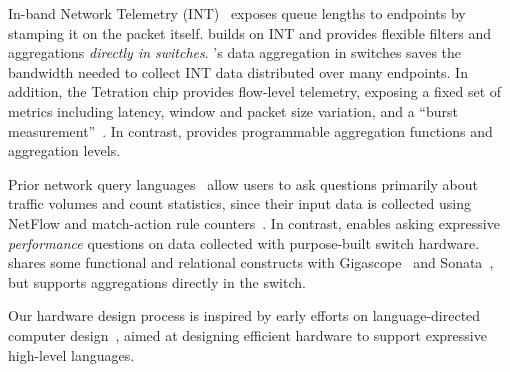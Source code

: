 
%

In-band Network Telemetry (INT)~\cite{int, tpp} exposes queue lengths to
endpoints by stamping it on the packet itself. \TheSystem builds on INT and
provides flexible filters and aggregations {\em directly in switches}.
\TheSystem's data aggregation in switches saves the bandwidth needed to collect
INT data distributed over many endpoints.  In addition, the Tetration chip
provides flow-level telemetry, exposing a fixed set of metrics including
latency, window and packet size variation, and a ``burst
measurement''~\cite{tetration-telemetry}. In contrast, \TheSystem provides
programmable aggregation functions and aggregation levels.%

 Prior network query languages~\cite{gigascope,
frenetic, path_query, streaming-monitoring} allow users to ask questions
primarily about traffic volumes and count statistics, since their input data is
collected using NetFlow and match-action rule counters~\cite{openflow}. In
contrast, \TheSystem enables asking expressive {\em performance} questions on
data collected with purpose-built switch hardware. \TheSystem shares some
functional and relational constructs with Gigascope~\cite{gigascope} and
Sonata~\cite{streaming-monitoring}, but supports aggregations directly in the
switch.

Our hardware design process is inspired by early efforts on language-directed
computer design~\cite{language-directed-computer-design, ditzel_patterson,
soar}, aimed at designing efficient hardware to support expressive high-level
languages.
